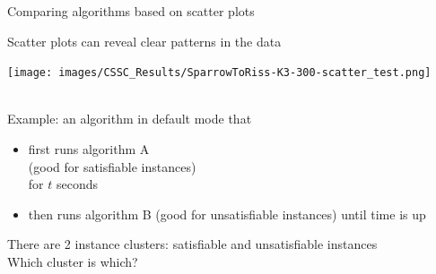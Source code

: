 \begin{frame}[c]{Comparing algorithms based on scatter plots}

Scatter plots can reveal clear patterns in the data

\begin{multicols}{2}
\begin{center}
\texttt{[image: images/CSSC\_Results/SparrowToRiss-K3-300-scatter\_test.png]}
\end{center}
\columnbreak
~\\
Example: an algorithm in default mode that
\begin{itemize}
  \item first runs algorithm A\\(good for satisfiable instances)\\for $t$ seconds
  \item then runs algorithm B (good for unsatisfiable instances) until time is up 
\end{itemize} 
\end{multicols}
\vspace*{-0.2cm}

\begin{center}

\pause
\smallskip
There are 2 instance clusters: satisfiable and unsatisfiable instances\\
\vspace*{0.1cm}
Which cluster is which? \\
\end{center}



\end{frame}


